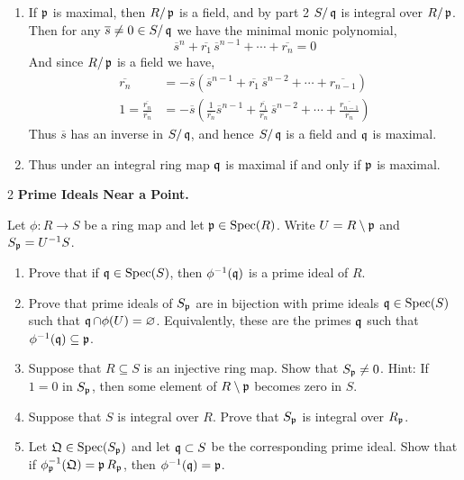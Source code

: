 \documentclass[Notebook.tex]{subfiles}
\begin{document}
\begin{solution}
\begin{enumerate}
        \item If $\operatorname{\mathfrak{p}}$ is maximal, then $R/\operatorname{\mathfrak{p}}$ is a field, and by part 2 $S/\operatorname{\mathfrak{q}}$ is integral over $R/\operatorname{\mathfrak{p}}$. Then for any $\overline{s} \neq 0 \in S/\operatorname{\mathfrak{q}}$ we have the minimal monic polynomial, 
        \[\overline{s}^n + \overline{r_1}\,\overline{s}^{n-1} + \cdots + \overline{r_n} = 0\]
        And since $R/\operatorname{\mathfrak{p}}$ is a field we have,
        \begin{align*}
           \overline{r_n} &= - \overline{s}(\overline{s}^{n-1} + \overline{r_1}\,\overline{s}^{n-2} + \cdots + \overline{r_{n-1}} ) \\ 
           1 = \frac{\overline{r_n}}{\overline{r_n}} &= - \overline{s} \left (\frac{1}{\overline{r_n}}\overline{s}^{n-1} + \frac{\overline{r_1}}{{\overline{r_n}}}\,\overline{s}^{n-2} + \cdots + \frac{\overline{r_{n-1}}}{\overline{r_n}} \right)
        \end{align*}
        Thus $\overline{s}$ has an inverse in $S/\operatorname{\mathfrak{q}}$, and hence $S/\operatorname{\mathfrak{q}}$ is a field and $\operatorname{\mathfrak{q}}$ is maximal. 

        \item Thus under an integral ring map $\operatorname{\mathfrak{q}}$ is maximal if and only if $\operatorname{\mathfrak{p}}$ is maximal. 
    \end{enumerate}
\end{solution}

\newpage 

\begin{problem}{2} \textbf{Prime Ideals Near a Point.} 
    
    Let $\phi:R\to S$ be a ring map and let $\operatorname{\mathfrak{p}}\in\operatorname{Spec}(R)$. Write $U=R\setminus \operatorname{\mathfrak{p}}$ and $S_{\operatorname{\mathfrak{p}}}=U^{-1}S$.
    \begin{enumerate}
        \item Prove that if $\operatorname{\mathfrak{q}}\in\operatorname{Spec}(S)$, then $\phi^{-1}(\operatorname{\mathfrak{q}})$ is a prime ideal of $R$.
        \item Prove that prime ideals of $S_{\operatorname{\mathfrak{p}}}$ are in bijection with prime ideals $\operatorname{\mathfrak{q}}\in\operatorname{Spec}(S)$ such that $\operatorname{\mathfrak{q}}\cap \phi(U)=\varnothing$. Equivalently, these are the primes $\operatorname{\mathfrak{q}}$ such that $\phi^{-1}(\operatorname{\mathfrak{q}})\subseteq \operatorname{\mathfrak{p}}$.
        \item Suppose that $R\subseteq S$ is an injective ring map. Show that $S_{\operatorname{\mathfrak{p}}}\neq 0$. Hint: If $1=0$ in $S_{\operatorname{\mathfrak{p}}}$, then some element of $R\setminus \operatorname{\mathfrak{p}}$ becomes zero in $S$.
        \item Suppose that $S$ is integral over $R$. Prove that $S_{\operatorname{\mathfrak{p}}}$ is integral over $R_{\operatorname{\mathfrak{p}}}$.
        \item Let $\mathfrak Q\in\operatorname{Spec}(S_{\operatorname{\mathfrak{p}}})$ and let $\operatorname{\mathfrak{q}}\subset S$ be the corresponding prime ideal. Show that if $\phi^{-1}_{\operatorname{\mathfrak{p}}}(\mathfrak Q)=\operatorname{\mathfrak{p}} R_{\operatorname{\mathfrak{p}}}$, then $\phi^{-1}(\operatorname{\mathfrak{q}})=\operatorname{\mathfrak{p}}$.
    \end{enumerate}
\end{problem}
\end{document}
